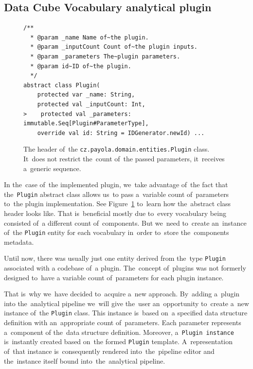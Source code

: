 \subsection{Data Cube Vocabulary analytical plugin}

\begin{figure}
  \begin{verbatim}
/**
  * @param _name Name of~the plugin.
  * @param _inputCount Count of~the plugin inputs.
  * @param _parameters The~plugin parameters.
  * @param id~ID of~the plugin.
  */
abstract class Plugin(
    protected var _name: String,
    protected val _inputCount: Int,
>    protected val _parameters: immutable.Seq[Plugin#ParameterType],
    override val id: String = IDGenerator.newId) ...
  \end{verbatim}
  \caption{The header of~the \texttt{cz.payola.domain.entities.Plugin} class. It~does not restrict the~count
  of~the passed parameters, it~receives a~generic sequence.}
  \label{fig:plugin-trait-code}
\end{figure}

In the~case of~the implemented plugin, we~take advantage of~the fact that the~\texttt{Plugin} abstract class allows us~to pass a~variable count of~parameters to~the 
plugin implementation. See Figure~\ref{fig:plugin-trait-code} to~learn how the~abstract class header 
looks like. That is~beneficial mostly due to~every vocabulary being consisted of~a 
different count of~components. But we~need to~create an~instance of~the \texttt{Plugin} entity
for each vocabulary in~order to~store the~components metadata.

Until now, there was usually just one entity derived from the~type \texttt{Plugin} associated with
a codebase of~a plugin. The~concept of~plugins was not formerly designed to~have
a variable count of~parameters for each plugin instance.

That is~why we~have decided to~acquire a~new approach. By~adding a~plugin 
into the~analytical pipeline we~will give the~user an~opportunity to~create a~new instance of~the \texttt{Plugin} class. This instance is~based on~a specified data structure definition
with an~appropriate count of~parameters. Each parameter represents a~component 
of the~data structure definition. Moreover, a~\texttt{Plugin instance} is~instantly created 
based on~the formed \texttt{Plugin} template. A~representation of~that instance is~consequently 
rendered into~the~pipeline editor and the~instance itself bound into~the~analytical pipeline.

